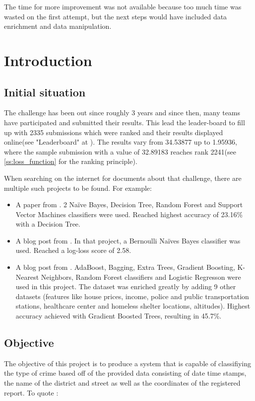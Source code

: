 \documentclass[12pt,a4paper]{scrartcl}
\begin{document}
The time for more improvement was not available because too much time was wasted on the first attempt, but the next steps would have included data enrichment and data manipulation.

\pagebreak
\section{Introduction}\label{s:intro}
\subsection{Initial situation}\label{ss:initial_situation}
The challenge has been out since roughly 3 years and since then, many teams have participated and submitted their results. This lead the leader-board to fill up with 2335 submissions which were ranked and their results displayed online(see "Leaderboard" at \cite{kgl_sf_crime}). The results vary from 34.53877 up to 1.95936, where the sample submission with a value of 32.89183 reaches rank 2241(see \ref{ss:loss_function} for the ranking principle).

When searching on the internet for documents about that challenge, there are multiple such projects to be found. For example:
\begin{itemize}
\item A paper from \cite{slideshare_sf_crime_prediction}. 2 Naïve Bayes, Decision Tree, Random Forest and Support Vector Machines classifiers were used. Reached highest accuracy of 23.16\% with a Decision Tree.
\item A blog post from \cite{efavdb_sf_crime_prediction}. In that project, a Bernoulli Naïves Bayes classifier was used. Reached a log-loss score of 2.58.
\item A blog post from \cite{mattmurray_blog}. AdaBoost, Bagging, Extra Trees, Gradient Boosting, K-Nearest Neighbors, Random Forest classifiers and Logistic Regresson were used in this project. The dataset was enriched greatly by adding 9 other datasets (features like house prices, income, police and public transportation stations, healthcare center and homeless shelter locations, altitudes). Highest accuracy achieved with Gradient Boosted Trees, resulting in 45.7\%.
\end{itemize}

\subsection{Objective}\label{ss:objective}
The objective of this project is to produce a system that is capable of classifiying the type of crime based off of the provided data consisting of date time stamps, the name of the district and street as well as the coordinates of the registered report. To quote \cite{kgl_sf_crime}:
\end{document}
